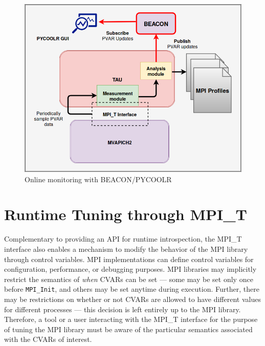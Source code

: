\begin{center}
        \begin{figure}[tbp!]
        \centering
                \includegraphics[scale=0.35,keepaspectratio]{figures/Online_Monitoring_Design}
                \caption{Online monitoring with BEACON/PYCOOLR}
                \label{fig:onlinemonitoringdesign}
        \end{figure}
\end{center}

\section{Runtime Tuning through MPI\_T}
Complementary to providing an API for runtime introspection, the MPI\_T interface also enables a mechanism to modify the behavior of the MPI library through control variables. MPI implementations can define control variables for configuration, performance, or debugging purposes. MPI libraries may implicitly restrict the semantics of \textit{when} CVARs can be set --- some may be set only once before \verb+MPI_Init+, and others may be set anytime during execution. Further, there may be restrictions on whether or not CVARs are allowed to have different values for different processes --- this decision is left entirely up to the MPI library. Therefore, a tool or a user interacting with the MPI\_T interface for the purpose of tuning the MPI library must be aware of the particular semantics associated with the CVARs of interest.
